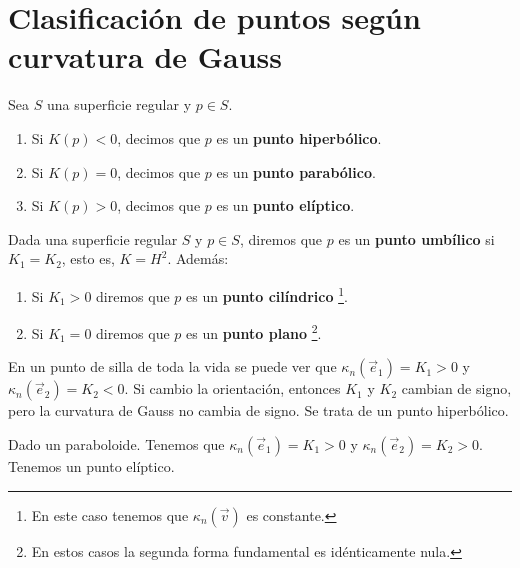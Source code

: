 \section{Clasificación de puntos según curvatura de Gauss}
\begin{definition}[Clasificación]
Sea $\displaystyle S $ una superficie regular y $\displaystyle p \in S $. 
\begin{enumerate}
\item Si $\displaystyle K\left(p\right) < 0 $, decimos que $\displaystyle p $ es un \textbf{punto hiperbólico}. 
\item Si $\displaystyle K\left(p\right) = 0 $, decimos que $\displaystyle p $ es un \textbf{punto parabólico}. 	
\item Si $\displaystyle K\left(p\right)> 0 $, decimos que $\displaystyle p $ es un \textbf{punto elíptico}. 
\end{enumerate}
\end{definition}
\begin{definition}
Dada una superficie regular $\displaystyle S $ y $\displaystyle p \in S $, diremos que $\displaystyle p $ es un \textbf{punto umbílico} si $\displaystyle K_{1}= K_{2} $, esto es, $\displaystyle K = H^{2} $. Además:
\begin{enumerate}
\item Si $\displaystyle K_{1} > 0 $ diremos que $\displaystyle p $ es un \textbf{punto cilíndrico} \footnote{En este caso tenemos que $\displaystyle \kappa_{n}\left(\vec{v}\right) $ es constante.}. 
\item Si $\displaystyle K_{1}= 0 $ diremos que $\displaystyle p $ es un \textbf{punto plano} \footnote{En estos casos la segunda forma fundamental es idénticamente nula.}. 
\end{enumerate}
\end{definition}
\begin{eg}
En un punto de silla de toda la vida se puede ver que $\displaystyle \kappa_{n}\left(\vec{e}_{1}\right)= K_{1} > 0 $ y $\displaystyle \kappa_{n}\left(\vec{e}_{2}\right)=K_{2} < 0 $. 
Si cambio la orientación, entonces $\displaystyle K_{1} $ y $\displaystyle K_{2} $ cambian de signo, pero la curvatura de Gauss no cambia de signo. Se trata de un punto hiperbólico.
\end{eg}
\begin{eg}
Dado un paraboloide. Tenemos que $\displaystyle \kappa_{n}\left(\vec{e}_{1}\right)= K_{1} > 0 $ y $\displaystyle \kappa_{n}\left(\vec{e}_{2}\right)=K_{2} > 0 $. Tenemos un punto elíptico. 
\end{eg}


